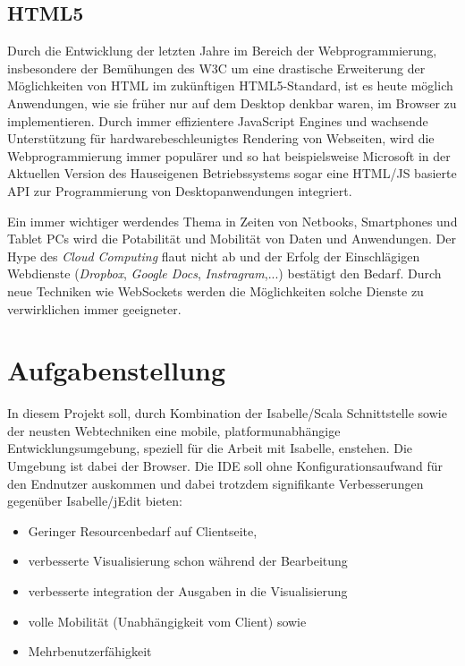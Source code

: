 \subsection{HTML5}

Durch die Entwicklung der letzten Jahre im Bereich der Webprogrammierung, insbesondere der
Bemühungen des W3C um eine drastische Erweiterung der Möglichkeiten von HTML im zukünftigen
HTML5-Standard, ist es heute möglich Anwendungen, wie sie früher nur auf dem Desktop denkbar waren,
im Browser zu implementieren. Durch immer effizientere JavaScript Engines und wachsende
Unterstützung für hardwarebeschleunigtes Rendering von Webseiten, wird die Webprogrammierung immer
populärer und so hat beispielsweise Microsoft in der Aktuellen Version des Hauseigenen
Betriebssystems sogar eine HTML/JS basierte API zur Programmierung von Desktopanwendungen
integriert.

Ein immer wichtiger werdendes Thema in Zeiten von Netbooks, Smartphones und Tablet PCs wird die
Potabilität und Mobilität von Daten und Anwendungen. Der Hype des \textit{Cloud Computing} flaut
nicht ab und der Erfolg der Einschlägigen Webdienste (\textit{Dropbox}, \textit{Google Docs},
\textit{Instragram},...) bestätigt den Bedarf. Durch neue Techniken wie WebSockets werden die
Möglichkeiten solche Dienste zu verwirklichen immer geeigneter.

\section{Aufgabenstellung}

In diesem Projekt soll, durch Kombination der Isabelle/Scala Schnittstelle sowie der neusten
Webtechniken eine mobile, platformunabhängige Entwicklungsumgebung, speziell für die Arbeit mit
Isabelle, enstehen. Die Umgebung ist dabei der Browser. Die IDE soll ohne Konfigurationsaufwand für
den Endnutzer auskommen und dabei trotzdem signifikante Verbesserungen gegenüber Isabelle/jEdit
bieten:

\begin{itemize}
  \item Geringer Resourcenbedarf auf Clientseite,
  \item verbesserte Visualisierung schon während der Bearbeitung
  \item verbesserte integration der Ausgaben in die Visualisierung
  \item volle Mobilität (Unabhängigkeit vom Client) sowie
  \item Mehrbenutzerfähigkeit
\end{itemize}

